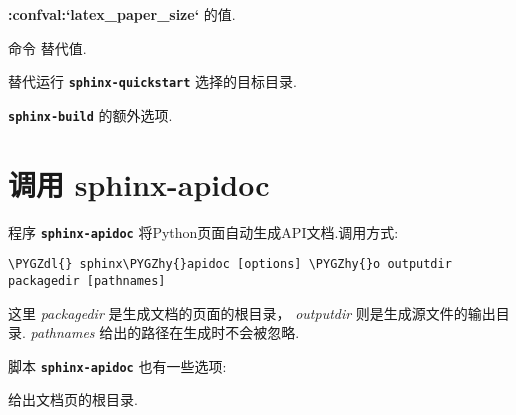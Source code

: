 \documentclass[letterpaper,10pt,english]{sphinxmanual}
\def\PYGZdl{\char`\$}
\def\PYGZhy{\char`\-}
\begin{document}
\begin{fulllineitems}
{\color{red}\bfseries{}:confval:{}`latex\_paper\_size{}`} 的值.

\end{fulllineitems}



\begin{fulllineitems}
命令  替代值.

\end{fulllineitems}



\begin{fulllineitems}
替代运行 \textbf{\texttt{sphinx-quickstart}} 选择的目标目录.

\end{fulllineitems}



\begin{fulllineitems}
\textbf{\texttt{sphinx-build}} 的额外选项.

\end{fulllineitems}



\chapter{调用 sphinx-apidoc}
\label{invocation:invocation-apidoc}\label{invocation:sphinx-apidoc}
程序 \textbf{\texttt{sphinx-apidoc}} 将Python页面自动生成API文档.调用方式:

\begin{Verbatim}[commandchars=\\\{\}]
\PYGZdl{} sphinx\PYGZhy{}apidoc [options] \PYGZhy{}o outputdir packagedir [pathnames]
\end{Verbatim}

这里 \emph{packagedir} 是生成文档的页面的根目录， \emph{outputdir} 则是生成源文件的输出目录.
\emph{pathnames} 给出的路径在生成时不会被忽略.

脚本 \textbf{\texttt{sphinx-apidoc}} 也有一些选项:

\begin{fulllineitems}
\label{invocation:cmdoption-sphinx-apidoc-o}
给出文档页的根目录.

\end{fulllineitems}
\end{document}
